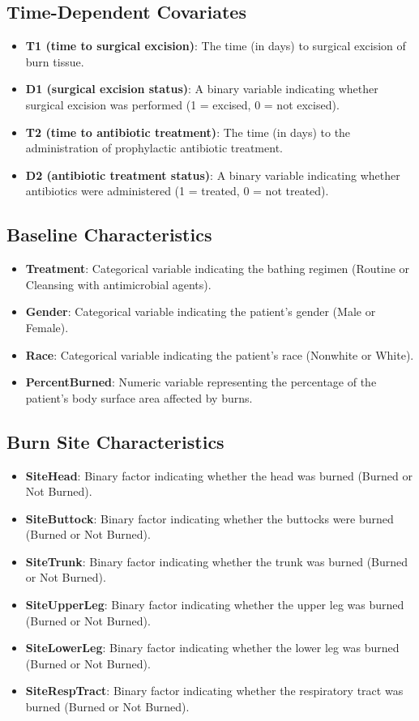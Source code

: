 \documentclass[12pt]{article}
\begin{document}
\subsection*{Time-Dependent Covariates}
\begin{itemize}
    \item \textbf{T1 (time to surgical excision)}: The time (in days) to surgical excision of burn tissue.
    \item \textbf{D1 (surgical excision status)}: A binary variable indicating whether surgical excision was performed (1 = excised, 0 = not excised).
    \item \textbf{T2 (time to antibiotic treatment)}: The time (in days) to the administration of prophylactic antibiotic treatment.
    \item \textbf{D2 (antibiotic treatment status)}: A binary variable indicating whether antibiotics were administered (1 = treated, 0 = not treated).
\end{itemize}

\subsection*{Baseline Characteristics}
\begin{itemize}
    \item \textbf{Treatment}: Categorical variable indicating the bathing regimen (Routine or Cleansing with antimicrobial agents).
    \item \textbf{Gender}: Categorical variable indicating the patient's gender (Male or Female).
    \item \textbf{Race}: Categorical variable indicating the patient's race (Nonwhite or White).
    \item \textbf{PercentBurned}: Numeric variable representing the percentage of the patient’s body surface area affected by burns.
\end{itemize}

\subsection*{Burn Site Characteristics}
\begin{itemize}
    \item \textbf{SiteHead}: Binary factor indicating whether the head was burned (Burned or Not Burned).
    \item \textbf{SiteButtock}: Binary factor indicating whether the buttocks were burned (Burned or Not Burned).
    \item \textbf{SiteTrunk}: Binary factor indicating whether the trunk was burned (Burned or Not Burned).
    \item \textbf{SiteUpperLeg}: Binary factor indicating whether the upper leg was burned (Burned or Not Burned).
    \item \textbf{SiteLowerLeg}: Binary factor indicating whether the lower leg was burned (Burned or Not Burned).
    \item \textbf{SiteRespTract}: Binary factor indicating whether the respiratory tract was burned (Burned or Not Burned).
\end{itemize}
\end{document}
